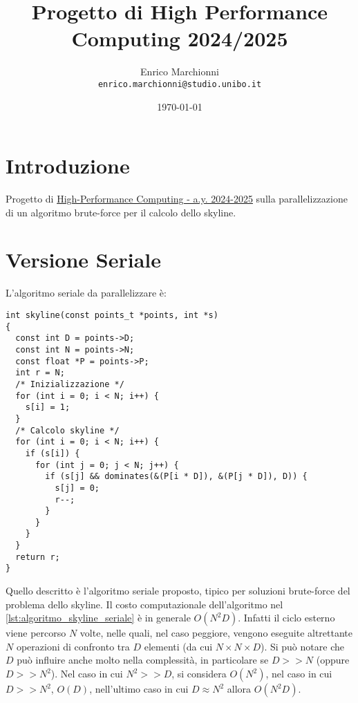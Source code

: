 \documentclass[11pt, a4paper]{article}
\title{
  Progetto di High Performance Computing 2024/2025
}
\author{
  Enrico Marchionni\\
  \texttt{enrico.marchionni@studio.unibo.it}
}
\date{\today}
\begin{document}
\maketitle

\section{Introduzione}

Progetto di \href{https://www.unibo.it/en/teaching/course-unit-catalogue/course-unit/2024/385080}
{High-Performance Computing - a.y. 2024-2025} sulla parallelizzazione di un algoritmo brute-force per il calcolo dello skyline.

\section{Versione Seriale}

L'algoritmo seriale da parallelizzare è:

\begin{lstlisting}[language=CStyle, caption={Algoritmo per il calcolo dello skyline in C.}, label={lst:algoritmo_skyline_seriale}]
int skyline(const points_t *points, int *s)
{
  const int D = points->D;
  const int N = points->N;
  const float *P = points->P;
  int r = N;
  /* Inizializzazione */
  for (int i = 0; i < N; i++) {
    s[i] = 1;
  }
  /* Calcolo skyline */
  for (int i = 0; i < N; i++) {
    if (s[i]) {
      for (int j = 0; j < N; j++) {
        if (s[j] && dominates(&(P[i * D]), &(P[j * D]), D)) {
          s[j] = 0;
          r--;
        }
      }
    }
  }
  return r;
}
\end{lstlisting}

Quello descritto è l'algoritmo seriale proposto, tipico per soluzioni brute-force del problema dello skyline.
Il costo computazionale dell'algoritmo nel \autoref{lst:algoritmo_skyline_seriale} è in generale \(O(N^2D)\).
Infatti il ciclo esterno viene percorso \(N\) volte, nelle quali, nel caso peggiore, vengono eseguite altrettante \(N\) operazioni
di confronto tra \(D\) elementi (da cui \(N \times N \times D\)).
Si può notare che \(D\) può influire anche molto nella complessità, in particolare se \(D >> N\) (oppure \(D >> N^2\)).
Nel caso in cui \(N^2 >> D\), si considera \(O(N^2)\), nel caso in cui \(D >> N^2\), \(O(D)\), nell'ultimo caso in cui
\(D \approx N^2\) allora \(O(N^2D)\).
\end{document}
